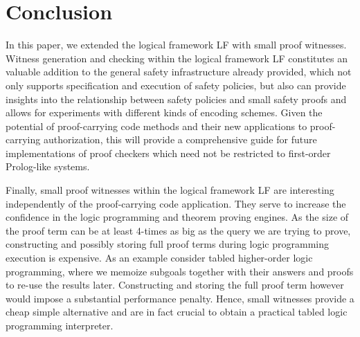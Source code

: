 \documentclass{llncs}
\begin{document}

\section{Conclusion}
In this paper, we extended the logical framework LF with small proof
witnesses. Witness generation and checking  within the logical
framework LF constitutes an valuable addition to the general safety
infrastructure already provided, which not only supports
specification and execution of safety policies, but also can provide
insights into the relationship between safety policies and small
safety proofs and allows for experiments with different kinds of
encoding schemes.
 Given the potential of 
proof-carrying code methods and their new applications to
proof-carrying authorization, this will provide a comprehensive guide
for future implementations of proof checkers which need not be restricted
to first-order Prolog-like systems. 

Finally, small proof witnesses within the logical framework LF are
interesting independently of the proof-carrying code application. They
serve to increase the confidence in the logic programming and theorem
proving engines. As the size of the proof term can be
at least 4-times as big as the query we are trying to prove,
constructing and possibly storing full proof terms during logic
programming execution is expensive. As an example consider tabled
higher-order logic programming, where we memoize subgoals together
with their answers and proofs to re-use the results
later. Constructing and storing the full proof term however would 
impose a substantial performance penalty. Hence, small witnesses
provide a cheap simple alternative and are in fact crucial to obtain a
practical tabled logic programming interpreter. 




\end{document}
